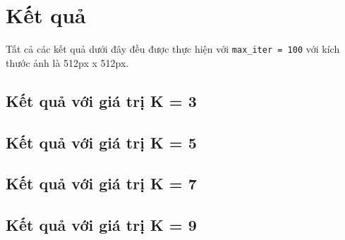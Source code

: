 \section{Kết quả}
Tất cả các kết quả dưới đây đều được thực hiện với \texttt{max\_iter = 100} với kích thước ảnh là 512px x 512px.

\subsection{Kết quả với giá trị K = 3}

\subsection{Kết quả với giá trị K = 5}
\subsection{Kết quả với giá trị K = 7}
\subsection{Kết quả với giá trị K = 9}
